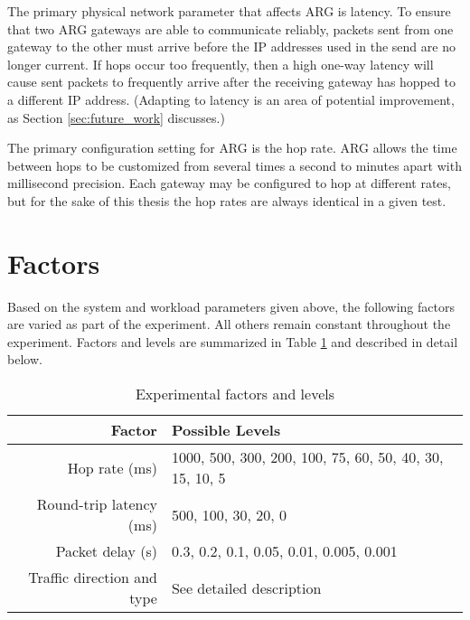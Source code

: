 \par The primary physical network parameter that affects \ac{ARG} is latency. To ensure that two \ac{ARG} gateways are able to communicate reliably, packets sent from one gateway to the other must arrive before the \ac{IP} addresses used in the send are no longer current. If hops occur too frequently, then a high one-way latency will cause sent packets to frequently arrive after the receiving gateway has hopped to a different \ac{IP} address. (Adapting to latency is an area of potential improvement, as Section \ref{sec:future_work} discusses.)

\par The primary configuration setting for \ac{ARG} is the hop rate. \ac{ARG} allows the time between hops to be customized from several times a second to minutes apart with millisecond precision. Each gateway may be configured to hop at different rates, but for the sake of this thesis the hop rates are always identical in a given test.

\section{Factors}
\FloatBarrier
\label{sec:factors}
\par Based on the system and workload parameters given above, the following factors are varied as part of the experiment. All others remain constant throughout the experiment. Factors and levels are summarized in Table \ref{tbl:factors} and described in detail below.

\begin{table}
\begin{center}
	\caption{Experimental factors and levels}
	\label{tbl:factors}
	
	\begin{tabular}{r|l}
	\textbf{Factor} & \textbf{Possible Levels} \\
	\hline
	Hop rate (ms) & 1000, 500, 300, 200, 100, 75, 60, 50, 40, 30, 15, 10, 5\\
	Round-trip latency (ms) & 500, 100, 30, 20, 0\\
	Packet delay (s) & 0.3, 0.2, 0.1, 0.05, 0.01, 0.005, 0.001\\
	Traffic direction and type & See detailed description
	\end{tabular}
\end{center}
\end{table}

